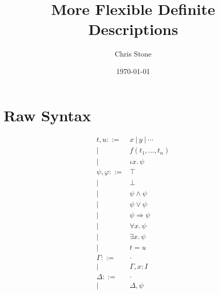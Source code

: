 \documentclass[10pt,a4paper]{article}
\begin{document}
\title{More Flexible Definite Descriptions}
\author{Chris Stone}
\date{\today}
\maketitle


\section{Raw Syntax}

\newcommand{\I}{I}

\renewcommand{\t}{t}
\renewcommand{\u}{u}
\newcommand{\f}{f}
\newcommand{\x}{x}
\newcommand{\y}{y}
\newcommand{\tFun}[3]{#1({#2}_1,\ldots,{#2}_{#3})}
\newcommand{\tDesc}[3]{\iota #1.\, #3}

\newcommand{\p}{\psi}
\newcommand{\q}{\varphi}
\renewcommand{\r}{\phi}
\newcommand{\pTrue}{\top}
\newcommand{\pFalse}{\bot}
\newcommand{\pExists}[3]{\exists #1.\, #3}
\newcommand{\pForall}[3]{\forall #1.\, #3}
\newcommand{\pAnd}[2]{#1 \wedge #2}
\newcommand{\pOr}[2]{#1 \vee #2}
\newcommand{\pImply}[2]{#1 \Rightarrow #2}
\newcommand{\pEqual}[2]{#1 = #2}
\newcommand{\pIff}[2]{#1 \Longleftrightarrow #2}

\newcommand{\G}{\Gamma}
\newcommand{\D}{\Delta}
\newcommand{\emptyCtx}{\cdot}

\renewcommand{\wp}[1]{\mathop{\mathsf{wp}}(#1)}
\newcommand{\trans}[1]{\ulcorner #1 \urcorner}

\newcommand{\jwfterm}[4]{#1;#2 \vdash #3\, :\, #4}
\newcommand{\jwfprop}[3]{#1;#2 \vdash #3\, :\, \mathsf{Prop}}
\newcommand{\jpf}[3]{#1;#2 \vdash #3}

\newcommand{\wfterm}[4]{#1;#2 \,\triangleright\, #3\, :\, #4}
\newcommand{\wfprop}[3]{#1;#2 \,\triangleright\, #3\,:\, \mathsf{Prop}}
\newcommand{\pf}[3]{#1;#2 \,\triangleright\, #3}

\newcommand{\subst}[3]{#1[#2{\mapsto}#3]}

\[
\begin{array}{rl}
\t,\u ::= & \x\ |\ \y\ |\ \cdots\\
     | &\tFun{\f}{\t}{n}\\
     | &\tDesc{\x}{\I}{\p}\\[10pt]

\p,\q ::= &\pTrue\\
| & \pFalse\\
| & \pAnd{\p}{\p}\\
| & \pOr{\p}{\p}\\
| & \pImply{\p}{\p}\\
| & \pForall{\x}{\I}{\p}\\
| & \pExists{\x}{\I}{\p}\\
| & \pEqual{\t}{\u}\\[10pt]

\G ::= & \emptyCtx\\
       |& \G,\x{:}\I\\[10pt]

\D ::= & \emptyCtx\\
       |& \D,\p\\[10pt]

\end{array}
\]
\end{document}
